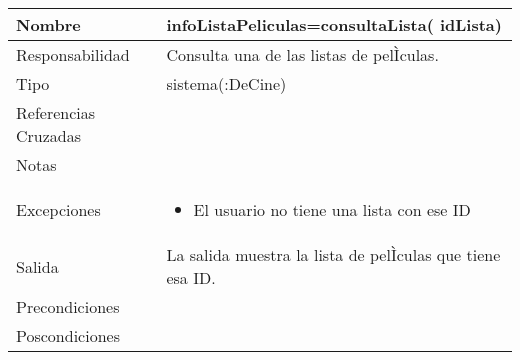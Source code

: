 \documentclass{article}
\begin{document}
\begin{table}[h]
\begin{tabular}{|l|l|l|l|l|l|}
\hline
\multicolumn{2}{|p{3cm}|}{Nombre} & \multicolumn{4}{p{10cm}|}{\textbf{infoListaPeliculas=consultaLista( idLista)}}\\
\hline
\multicolumn{2}{|p{3cm}|}{Responsabilidad} & \multicolumn{4}{p{10cm}|}{Consulta una de las listas de pelÌculas.} \\
\hline
\multicolumn{2}{|p{3cm}|}{Tipo} & \multicolumn{4}{p{10cm}|}{sistema(:DeCine)} \\
\hline
\multicolumn{2}{|p{3cm}|}{Referencias Cruzadas} & \multicolumn{4}{p{10cm}|}{} \\
\hline
\multicolumn{2}{|p{3cm}|}{Notas} & \multicolumn{4}{p{10cm}|}{} \\
\hline
\multicolumn{2}{|p{3cm}|}{Excepciones} & \multicolumn{4}{p{10cm}|}{\begin{itemize}
\item El usuario no tiene una lista con ese ID
\end{itemize}} \\
\hline
\multicolumn{2}{|p{3cm}|}{Salida} & \multicolumn{4}{p{10cm}|}{La salida muestra la lista de pelÌculas que tiene esa ID.} \\
\hline
\multicolumn{2}{|p{3cm}|}{Precondiciones} & \multicolumn{4}{p{10cm}|}{} \\
\hline
\multicolumn{2}{|p{3cm}|}{Poscondiciones} & \multicolumn{4}{p{10cm}|}{} \\
\hline
\end{tabular}
\end{table}
\end{document}
